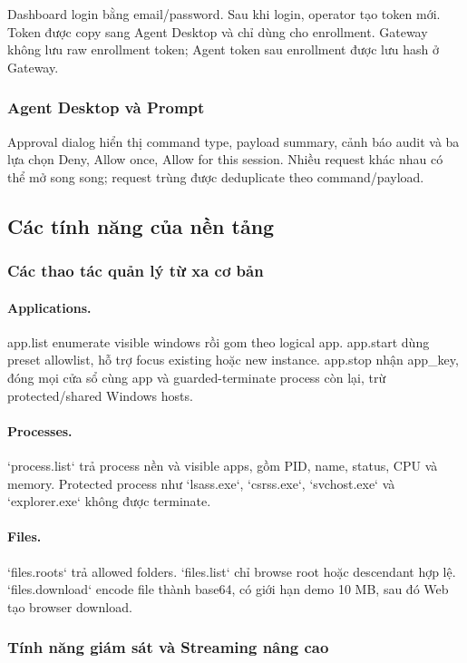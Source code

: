 \documentclass[12pt,a4paper]{article}
\begin{document}
Dashboard login bằng email/password. Sau khi login, operator tạo token mới. Token được copy sang Agent Desktop và chỉ dùng cho enrollment. Gateway không lưu raw enrollment token; Agent token sau enrollment được lưu hash ở Gateway.

\subsubsection{Agent Desktop và Prompt}

Approval dialog hiển thị command type, payload summary, cảnh báo audit và ba lựa chọn Deny, Allow once, Allow for this session. Nhiều request khác nhau có thể mở song song; request trùng được deduplicate theo command/payload.

\subsection{Các tính năng của nền tảng}

\subsubsection{Các thao tác quản lý từ xa cơ bản}

\paragraph{Applications.} app.list enumerate visible windows rồi gom theo logical app. app.start dùng preset allowlist, hỗ trợ focus existing hoặc new instance. app.stop nhận app_key, đóng mọi cửa sổ cùng app và guarded-terminate process còn lại, trừ protected/shared Windows hosts.

\paragraph{Processes.} `process.list` trả process nền và visible apps, gồm PID, name, status, CPU và memory. Protected process như `lsass.exe`, `csrss.exe`, `svchost.exe` và `explorer.exe` không được terminate.

\paragraph{Files.} `files.roots` trả allowed folders. `files.list` chỉ browse root hoặc descendant hợp lệ. `files.download` encode file thành base64, có giới hạn demo 10 MB, sau đó Web tạo browser download.

\subsubsection{Tính năng giám sát và Streaming nâng cao}
\end{document}
